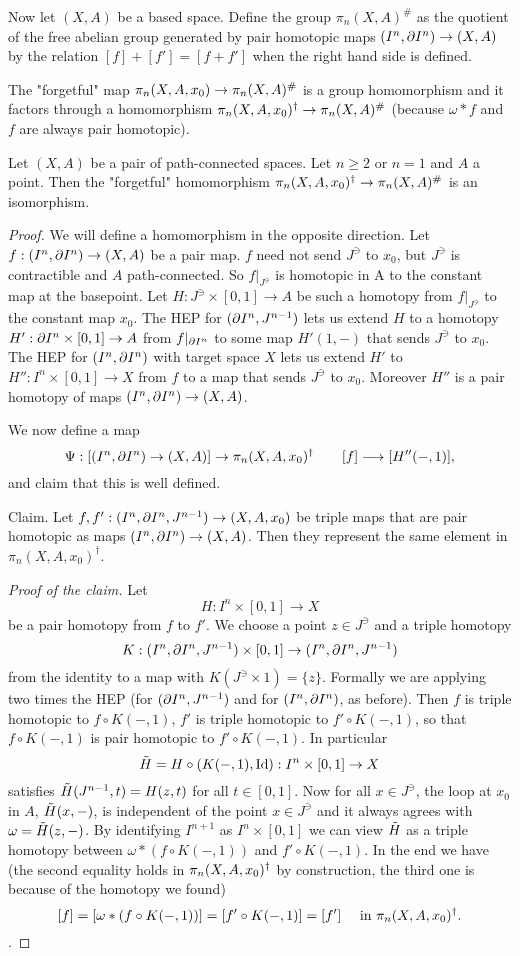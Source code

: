 Now let $(X,A)$ be a based space. Define the group $\pi_n(X,A)^\#$ as the quotient of the free abelian group generated by pair homotopic maps $(I^n,\partial I^n)\to (X,A)$ by the relation $[f]+[f']=[f+f']$ when the right hand side is defined.

The "forgetful" map $\pi_n(X,A,x_0)\to\pi_n(X,A)^\#$ is a group homomorphism and it factors through a homomorphism $\pi_n(X,A,x_0)^\dagger\to\pi_n(X,A)^\#$ (because $\omega * f$ and $f$ are always pair homotopic).

\begin{proposition}
Let $(X,A)$ be a pair of path-connected spaces. Let $n\geq2$ or $n=1$ and $A$ a point. Then the "forgetful" homomorphism $\pi_n(X,A,x_0)^\dagger\to\pi_n(X,A)^\#$ is an isomorphism.
\end{proposition}

\begin{proof}
We will define a homomorphism in the opposite direction. Let $f:(I^n,\partial I^n)\to (X,A)$ be a pair map. $f$ need not send $J^\ni$ to $x_0$, but $J^\ni$ is contractible and $A$ path-connected. So $f|_{J^\ni}$ is homotopic in A to the constant map at the basepoint. Let $H:J^\ni\times[0,1]\to A$ be such a homotopy from $f|_{J^\ni}$ to the constant map $x_0$. The HEP for $(\partial I^n,J^{n-1})$ lets us extend $H$ to a homotopy $H':\partial I^n\times[0,1]\to A$ from $f|_{\partial I^n}$ to some map $H'(1,-)$ that sends $J^\ni$ to $x_0$. The HEP for $(I^n,\partial I^n)$ with target space $X$ lets us extend $H'$ to $H'':I^n\times[0,1]\to X$ from $f$ to a map that sends $J^\ni$ to $x_0$. Moreover $H''$ is a pair homotopy of maps $(I^n,\partial I^n)\to (X,A)$.

We now define a map 
$$\Psi:[(I^n,\partial I^n)\to (X,A)]\to \pi_n(X,A,x_0)^\dagger \qquad [f] \longrightarrow [H''(-,1)],$$
and claim that this is well defined.
 
Claim. Let $f,f':(I^n,\partial I^n, J^{n-1})\to(X,A,x_0)$ be triple maps that are pair homotopic as maps $(I^n,\partial I^n)\to (X,A)$. Then they represent the same element in $\pi_n(X,A,x_0)^\dagger$.
 
\textit{Proof of the claim.} Let $$H:I^n\times[0,1]\to X$$
 be a pair homotopy from $f$ to $f'$. We choose a point $z\in J^\ni$ and a triple homotopy 
 $$K:(I^n,\partial I^n,J^{n-1})\times[0,1]\to(I^n,\partial I^n,J^{n-1})$$
  from the identity to a map with $K(J^\ni\times 1)=\{z\}$. Formally we are applying two times the HEP (for $(\partial I^n,J^{n-1})$ and for $(I^n,\partial I^n)$, as before). Then $f$ is triple homotopic to $f\circ K(-,1)$, $f'$ is triple homotopic to $f'\circ K(-,1)$, so that $f\circ K(-,1)$ is pair homotopic to $f'\circ K(-,1)$. In particular 
 $$\tilde{H}=H \circ (K(-,1),\operatorname{Id}): I^n\times[0,1]\to X$$
  satisfies $\tilde{H}(J^{n-1},t)=H(z,t)$ for all $t\in [0,1]$. Now for all $x\in J^\ni$, the loop at $x_0$ in $A$, $\tilde{H}(x,-)$, is independent of the point $x\in J^\ni$ and it always agrees with $\omega=\tilde{H}(z,-)$. By identifying $I^{n+1}$ as $I^n\times[0,1]$ we can view $\tilde{H}$ as a triple homotopy between $\omega * (f\circ K(-,1))$ and $f'\circ K(-,1)$.\normalmarginpar{} In the end we have (the second equality holds in $\pi_n(X,A,x_0)^\dagger$ by construction, the third one is because of the homotopy we found)
 $$[f]=[\omega * (f\circ K(-,1))]=[f'\circ K(-,1)]=[f'] \quad \text{ in } \pi_n(X,A,x_0)^\dagger.$$
  .


\end{proof}
